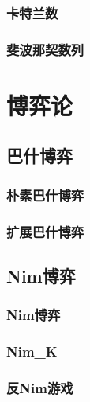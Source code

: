 \documentclass[10pt,a4paper]{article}
\begin{document}
\subsubsection{卡特兰数}
\begin{spacing}{1.5}

\end{spacing}
\subsubsection{斐波那契数列}
\begin{spacing}{1.5}

\end{spacing}
\section{博弈论}
\subsection{巴什博弈}
\subsubsection{朴素巴什博弈}
\begin{spacing}{1.5}

\end{spacing}
\subsubsection{扩展巴什博弈}
\begin{spacing}{1.5}

\end{spacing}
\subsection{Nim博弈}
\subsubsection{Nim博弈}
\begin{spacing}{1.5}

\end{spacing}
\subsubsection{Nim\_K}
\begin{spacing}{1.5}

\end{spacing}
\subsubsection{反Nim游戏}
\begin{spacing}{1.5}

\end{spacing}
\end{document}
